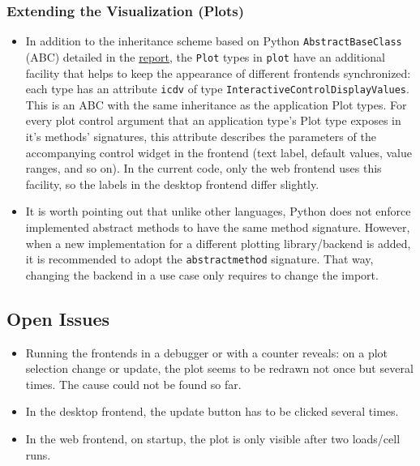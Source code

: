 \subsubsection{Extending the Visualization
  (Plots)}\label{extending-the-visualization-plots}

\begin{itemize}
    \tightlist
\item
    In addition to the inheritance scheme based on Python
    \texttt{AbstractBaseClass} (ABC) detailed in the
    \href{./doc/report.pdf}{report}, the \texttt{Plot} types in
    \texttt{plot} have an additional facility that helps to keep the
    appearance of different frontends synchronized: each type has an
    attribute \texttt{icdv} of type
    \texttt{InteractiveControlDisplayValues}. This is an ABC with the same
    inheritance as the application Plot types. For every plot control
    argument that an application type's Plot type exposes in it's methods'
    signatures, this attribute describes the parameters of the
    accompanying control widget in the frontend (text label, default
    values, value ranges, and so on). In the current code, only the web
    frontend uses this facility, so the labels in the desktop frontend
    differ slightly.\\
\item
    It is worth pointing out that unlike other languages, Python does not
    enforce implemented abstract methods to have the same method
    signature. However, when a new implementation for a different plotting
    library/backend is added, it is recommended to adopt the
    \texttt{abstractmethod} signature. That way, changing the backend in a
    use case only requires to change the import.
\end{itemize}

\subsection{Open Issues}
\label{sec:open-issues}

\begin{itemize}
\item Running the frontends in a debugger or with a counter reveals: on a plot
    selection change or update, the plot seems to be redrawn not once but
    several times. The cause could not be found so far.
\item In the desktop frontend, the update button has to be clicked several times.
\item In the web frontend, on startup, the plot is only visible after two loads/cell runs.   
\end{itemize}


